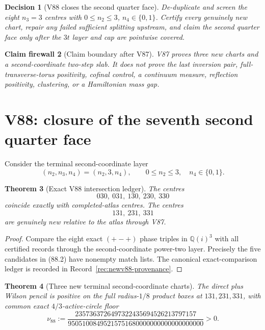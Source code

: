 \documentclass[11pt,oneside]{article}
\newtheorem{theorem}{Theorem}[section]
\newtheorem{firewall}[theorem]{Claim firewall}
\newtheorem{decision}[theorem]{Decision}
\theoremstyle{definition}
\theoremstyle{remark}
\begin{document}
\begin{decision}[V88 closes the second quarter face]
\label{dec:newv87-next}
De-duplicate and screen the eight \(n_3=3\) centres with
\(0\leq n_2\leq3\), \(n_4\in\{0,1\}\).  Certify every genuinely
new chart, repair any failed sufficient splitting upstream, and
claim the second quarter face only after the \(3t\) layer and cap
are pointwise covered.
\end{decision}

\begin{firewall}[Claim boundary after V87]
\label{fire:newv87-final}
V87 proves three new charts and a second-coordinate two-step slab.
It does not prove the last inversion pair, full-transverse-torus
positivity, cofinal control, a continuum measure, reflection
positivity, clustering, or a Hamiltonian mass gap.
\end{firewall}

\section{V88: closure of the seventh second quarter face}
\label{sec:newv88-seventh-second-face}

Consider the terminal second-coordinate layer
\[
 (n_2,n_3,n_4)=(n_2,3,n_4),\qquad
 0\leq n_2\leq3,\quad n_4\in\{0,1\}.                 \tag{88.1}
\]

\begin{theorem}[Exact V88 intersection ledger]
\label{thm:newv88-intersection}
The centres
\[
 030,\ 031,\ 130,\ 230,\ 330                         \tag{88.2}
\]
coincide exactly with completed-atlas centres.  The centres
\[
 131,\ 231,\ 331                                     \tag{88.3}
\]
are genuinely new relative to the atlas through V87.
\end{theorem}

\begin{proof}
Compare the eight exact \((+-+)\) phase triples in
\(\mathbb Q(i)^3\) with all certified records through the
second-coordinate power-two layer.  Precisely the five candidates
in (88.2) have nonempty match lists.  The canonical exact-comparison
ledger is recorded in Record~\ref{rec:newv88-provenance}.
\end{proof}

\begin{theorem}[Three new terminal second-coordinate charts]
\label{thm:newv88-three-charts}
The direct plus Wilson pencil is positive on the full
radius-\(1/8\) product boxes at \(131,231,331\), with common exact
\(4/3\)-active-circle floor
\[
\nu_{88}:=
\frac{2357363726497322435694526213797157}
     {95051008495215751680000000000000000000}>0.      \tag{88.4}
\]
\end{theorem}
\end{document}
